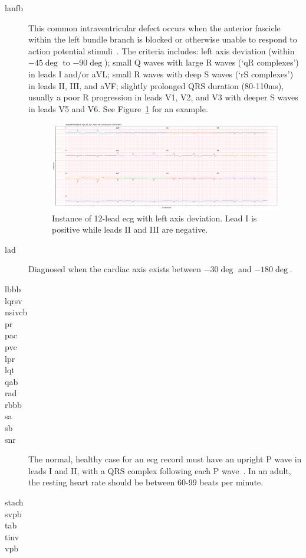 \documentclass[\main/thesis.tex]{subfiles}
\begin{document}
\begin{description}
\begin{figure}
        \label{fig:full_LAnFB}
    \end{figure} 
    \item[\gls{lanfb}] This common intraventricular defect occurs when the anterior fascicle within the left bundle branch is blocked or otherwise unable to respond to action potential stimuli~\cite{ecg-utah-lesson}. The criteria includes: left axis deviation (within $-45\deg$ to $-90\deg$); small Q waves with large R waves (`qR complexes') in leads I and/or aVL; small R waves with deep S waves (`rS complexes') in leads II, III, and aVF; slightly prolonged QRS duration (80-110ms), usually a poor R progression in leads V1, V2, and V3 with deeper S waves in leads V5 and V6. See Figure~\ref{fig:full_LAnFB} for an example.
    \begin{figure}
        \centering
        \includegraphics[width=14cm]{figure/LAD/full_69_18482.pdf}
        \caption{Instance of 12-lead \gls{ecg} with left axis deviation. Lead I is positive while leads II and III are negative.}
        \label{fig:full_LAD}
    \end{figure}

    \item[\gls{lad}] Diagnosed when the cardiac axis exists between $-30\deg$ and $-180\deg$.
    \item[\gls{lbbb}]
    \item[\gls{lqrsv}]
    \item[\gls{nsivcb}]
    \item[\gls{pr}]
    \item[\gls{pac}]
    \item[\gls{pvc}]
    \item[\gls{lpr}]
    \item[\gls{lqt}]
    \item[\gls{qab}]
    \item[\gls{rad}]
    \item[\gls{rbbb}]
    \item[\gls{sa}]
    \item[\gls{sb}]
    \item[\gls{snr}] The normal, healthy case for an \gls{ecg} record must have an upright P wave in leads I and II, with a QRS complex following each P wave~\cite{meek_introduction_2002}. In an adult, the resting heart rate should be between 60-99 beats per minute.
    \item[\gls{stach}]
    \item[\gls{svpb}]
    \item[\gls{tab}]
    \item[\gls{tinv}]
    \item[\gls{vpb}]
\end{description}
\end{document}

